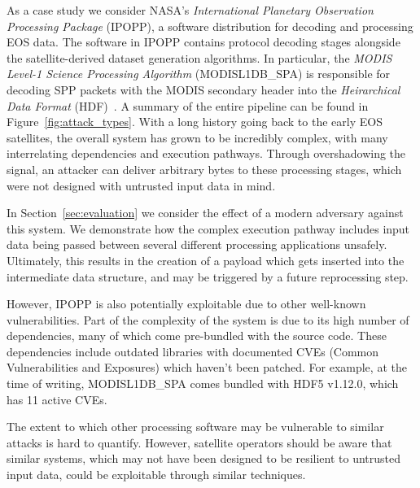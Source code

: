 As a case study we consider NASA's \textit{International Planetary Observation Processing Package} (IPOPP), a software distribution for decoding and processing EOS data.
The software in IPOPP contains protocol decoding stages alongside the satellite-derived dataset generation algorithms.
In particular, the \textit{MODIS Level-1 Science Processing Algorithm} (MODISL1DB\_SPA) is responsible for decoding SPP packets with the MODIS secondary header into the \textit{Heirarchical Data Format} (HDF)~\cite{modisL1DB}.
A summary of the entire pipeline can be found in Figure~\ref{fig:attack_types}.
With a long history going back to the early EOS satellites, the overall system has grown to be incredibly complex, with many interrelating dependencies and execution pathways.
Through overshadowing the signal, an attacker can deliver arbitrary bytes to these processing stages, which were not designed with untrusted input data in mind.

In Section~\ref{sec:evaluation} we consider the effect of a modern adversary against this system.
We demonstrate how the complex execution pathway includes input data being passed between several different processing applications unsafely.
Ultimately, this results in the creation of a payload which gets inserted into the intermediate data structure, and may be triggered by a future reprocessing step.

However, IPOPP is also potentially exploitable due to other well-known vulnerabilities.
Part of the complexity of the system is due to its high number of dependencies, many of which come pre-bundled with the source code.
These dependencies include outdated libraries with documented CVEs (Common Vulnerabilities and Exposures) which haven't been patched.
For example, at the time of writing, MODISL1DB\_SPA comes bundled with HDF5 v1.12.0, which has 11 active CVEs.



The extent to which other processing software may be vulnerable to similar attacks is hard to quantify.
However, satellite operators should be aware that similar systems, which may not have been designed to be resilient to untrusted input data, could be exploitable through similar techniques.

